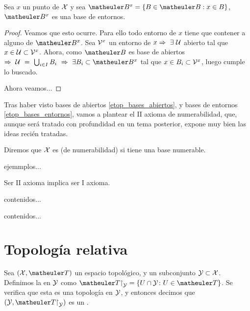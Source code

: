 \begin{prop}
	Sea $x$ un punto de $\mathcal{X}$ y sea $\B^{x} = \{B \in \B : x \in B\}$, $\B^{x}$ es una base de entornos.
\end{prop}
\begin{proof} Veamos que esto ocurre. Para ello todo entorno de $x$ tiene que contener a alguno de $\B^{x}$. Sea $\mathcal{V}^{x}$ un entorno de $x \Rightarrow\ \exists\ \mathcal{U}$ abierto tal que $x \in \mathcal{U} \subset \mathcal{V}^{x}$. Ahora, como $\B$ es base de abiertos $\ra\ \U\ =\ \bigcup_{i\in I}B_i\ \ra\ \exists B_{i} \subset \B^{x}$ tal que $x \in B_{i} \subset \mathcal{V}^{x}$, luego cumple lo buscado.
	
	
Ahora veamos...%
\end{proof}

Tras haber visto bases de abiertos \ref{etop_bases_abiertos}, y bases de entornos \ref{etop_bases_entornos}, vamos a plantear el II axioma de numerabilidad, que, aunque será tratado con profundidad en un tema posterior, expone muy bien las ideas recién tratadas.
\begin{defi}
	\label{etop_2_axioma_num}
	Diremos que $\mathcal{X}$ es  (de numerabilidad) si tiene una base numerable.
\begin{exa}
	ejemmplos...%
\end{exa}
\end{defi}
\begin{obs}
	Ser II axioma implica ser I axioma. %
\end{obs}
\begin{prop}
	contenidos...
\end{prop}
\begin{exa}
	contenidos...
\end{exa}


\section{Topología relativa}

\begin{defi}
	Sea $(\X,\T)$ un espacio topológico, y un subconjunto $\mathcal{Y}\subset\mathcal{X}$. Definimos la  en $\mathcal{Y}$ como $\T\restriction_\mc{Y} = \{U\cap\mc{Y}\colon U\in\T\}$. Se verifica que esta es una topología en $\mathcal{Y}$, y entonces decimos que $(\mc{Y},\T\restriction_\mc{Y})$ es un .
\end{defi}

